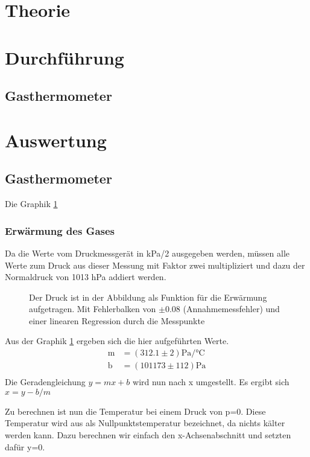 \documentclass[12pt,a4paper,titlepage,headinclude,bibtotoc]{scrartcl}
\begin{document}
\section{Theorie}
\label{sec:theorie}



\section{Durchführung}
\label{sec:durchfuehrung}
\subsection{Gasthermometer}

\section{Auswertung}
\label{sec:auswertung}

\subsection{Gasthermometer}
Die Graphik \ref{fig:gas1} 
\subsubsection{Erwärmung des Gases}
\label{sec:gas1}
Da die Werte vom Druckmessgerät in kPa/2 ausgegeben werden, müssen alle Werte zum Druck aus dieser Messung mit Faktor zwei multipliziert und dazu der Normaldruck von 1013 hPa addiert werden.
\begin{figure}[!h]
\centering

\caption{Der Druck ist in der Abbildung als Funktion für die Erwärmung aufgetragen. Mit Fehlerbalken von $\pm$0.08 (Annahmemessfehler) und einer linearen Regression durch die Messpunkte}
\label{fig:gas1}
\end{figure}

Aus der Graphik \ref{fig:gas1} ergeben sich die hier aufgeführten Werte.
\begin{align*}
	\text{m} &= (312.1\pm 2)\si{\pascal/\celsius}\\
	\text{b} &= (101173\pm112)\si{\pascal}\\
\end{align*}
Die Geradengleichung $y=mx+b$ wird nun nach x umgestellt. Es ergibt sich $x=y-b/m$

Zu berechnen ist nun die Temperatur bei einem Druck von p=0. Diese Temperatur wird aus als Nullpunktstemperatur bezeichnet, da nichts kälter werden kann. Dazu berechnen wir einfach den x-Achsenabschnitt und setzten dafür y=0.
\end{document}
